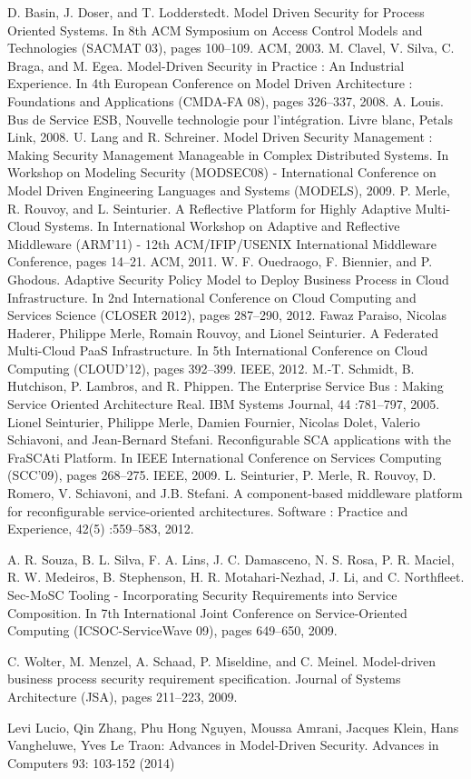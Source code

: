 \documentclass[runningheads,a4paper]{llncs}
\begin{document}
\begin{thebibliography}{4}

 D. Basin, J. Doser, and T. Lodderstedt. Model Driven Security for Process
Oriented Systems. In 8th ACM Symposium on Access Control Models and
Technologies (SACMAT 03), pages 100–109. ACM, 2003.
M. Clavel, V. Silva, C. Braga, and M. Egea. Model-Driven Security in Practice : An Industrial Experience. In 4th European Conference on Model Driven
Architecture : Foundations and Applications (CMDA-FA 08), pages 326–337,
2008.
 A. Louis. Bus de Service ESB, Nouvelle technologie pour l’int\'egration. Livre
blanc, Petals Link, 2008.
 U. Lang and R. Schreiner. Model Driven Security Management : Making
Security Management Manageable in Complex Distributed Systems. In Workshop on Modeling Security (MODSEC08) - International Conference on Model
Driven Engineering Languages and Systems (MODELS), 2009.
 P. Merle, R. Rouvoy, and L. Seinturier. A Reflective Platform for Highly Adaptive Multi-Cloud Systems. In International Workshop
on Adaptive and Reflective Middleware (ARM’11) - 12th ACM/IFIP/USENIX
International Middleware Conference, pages 14–21. ACM, 2011.
 W. F. Ouedraogo, F. Biennier, and P. Ghodous.
Adaptive Security Policy Model to Deploy Business Process in Cloud Infrastructure. In 2nd International Conference on Cloud Computing and Services Science (CLOSER 2012), pages 287–290, 2012.
 Fawaz Paraiso, Nicolas Haderer, Philippe Merle, Romain Rouvoy, and Lionel
Seinturier. A Federated Multi-Cloud PaaS Infrastructure. In 5th International
Conference on Cloud Computing (CLOUD’12), pages 392–399. IEEE, 2012.
 M.-T. Schmidt, B. Hutchison, P. Lambros, and R. Phippen. The Enterprise
Service Bus : Making Service Oriented Architecture Real. IBM Systems Journal, 44 :781–797, 2005.
Lionel Seinturier, Philippe Merle, Damien Fournier, Nicolas Dolet, Valerio
Schiavoni, and Jean-Bernard Stefani. Reconfigurable SCA applications with
the FraSCAti Platform. In IEEE International Conference on Services Computing (SCC’09), pages 268–275. IEEE, 2009.
L. Seinturier, P. Merle, R. Rouvoy, D. Romero, V. Schiavoni, and J.B. Stefani. A component-based middleware platform for reconfigurable service-oriented architectures. Software : Practice and Experience, 42(5) :559–583, 2012.

A. R. Souza, B. L. Silva, F. A. Lins, J. C. Damasceno, N. S. Rosa, P. R. Maciel,
R. W. Medeiros, B. Stephenson, H. R. Motahari-Nezhad, J. Li, and C. Northfleet. Sec-MoSC Tooling - Incorporating Security Requirements into Service Composition. In 7th International Joint Conference on Service-Oriented Computing (ICSOC-ServiceWave 09), pages 649–650, 2009.

C. Wolter, M. Menzel, A. Schaad, P. Miseldine, and C. Meinel. Model-driven business process security requirement specification. Journal of Systems Architecture (JSA), pages 211–223, 2009.

 Levi Lucio, Qin Zhang, Phu Hong Nguyen, Moussa Amrani, Jacques Klein, Hans Vangheluwe, Yves Le Traon: Advances in Model-Driven Security. Advances in Computers 93: 103-152 (2014)
\end{thebibliography}
\end{document}
